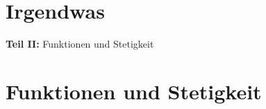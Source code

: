 \documentclass[consecutivenumbering, transparentEnvironments]{gadsescript}
\begin{document}
\maketitle

\tableofcontents
\newpage

\part{Irgendwas}






\textbf{Teil II:} Funktionen und Stetigkeit
\part{Funktionen und Stetigkeit}


\end{document}
